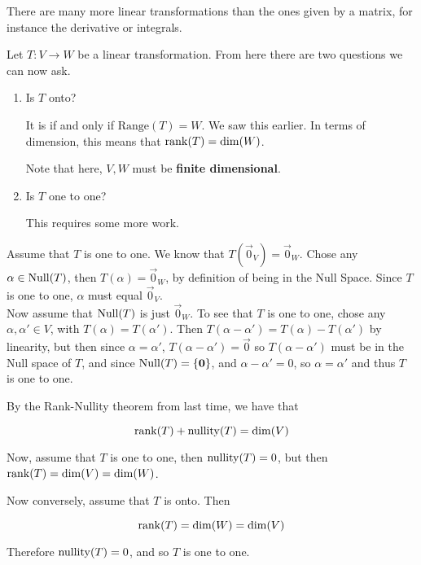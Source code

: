 \documentclass[12pt]{article}
\def\range{\text{Range}}
\begin{document}
  There are many more linear transformations than the ones given by a matrix,
  for instance the derivative or integrals.

  Let $T: V \to W$ be a linear transformation. From here there are two questions
  we can now ask.

  \begin{enumerate}
    \item Is $T$ onto?

      It is if and only if $\range(T) = W$. We saw this earlier.
      In terms of dimension, this means that $\mathrm{rank}(T) = \dim(W)$.

      Note that here, $V, W$ must be {\bf finite dimensional}.

    \item Is $T$ one to one?

      This requires some more work.
  \end{enumerate}

  {
    Assume that $T$ is one to one. We know that $T(\vec{0}_V) = \vec{0}_W$.
    Chose any $\alpha \in \mathrm{Null}(T)$, then $T(\alpha) = \vec{0}_W$, by definition
    of being in the Null Space. Since $T$ is one to one, $\alpha$ must equal
    $\vec{0}_V$. \\

    Now assume that $\mathrm{Null}(T)$ is just $\vec{0}_W$. To see that $T$ is one to
    one, chose any $\alpha, \alpha' \in V$, with $T(\alpha) = T(\alpha')$. Then
    $T(\alpha - \alpha') = T(\alpha) - T(\alpha')$ by linearity, but then since
    $\alpha = \alpha'$, $T(\alpha - \alpha') = \vec{0}$ so $T(\alpha - \alpha')$
    must be in the Null space of $T$, and since $\mathrm{Null}(T) = \{{\bf 0}\}$, and
    $\alpha - \alpha' = 0$, so $\alpha = \alpha'$ and thus $T$ is one to one.
  }


  {
    By the Rank-Nullity theorem from last time, we have that

    \[
      \mathrm{rank}(T) + \mathrm{nullity}(T) = \dim(V)
    \]

    Now, assume that $T$ is one to one, then $\mathrm{nullity}(T) = 0$, but then $\mathrm{rank}(T)
    = \dim(V) = \dim(W)$.

    Now conversely, assume that $T$ is onto. Then

    \[
      \mathrm{rank}(T) = \dim(W) = \dim(V)
    \]

    Therefore $\mathrm{nullity}(T) = 0$, and so $T$ is one to one.
  }
\end{document}

